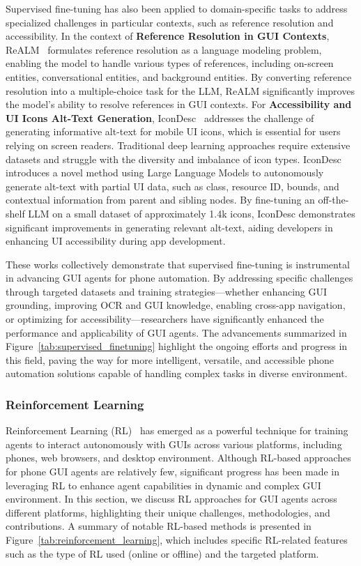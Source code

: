 Supervised fine-tuning has also been applied to domain-specific tasks to address specialized challenges in particular contexts, such as reference resolution and accessibility.
In the context of \textbf{Reference Resolution in GUI Contexts}, ReALM~\cite{moniz2024realm} formulates reference resolution as a language modeling problem, enabling the model to handle various types of references, including on-screen entities, conversational entities, and background entities. By converting reference resolution into a multiple-choice task for the LLM, ReALM significantly improves the model's ability to resolve references in GUI contexts.
For \textbf{Accessibility and UI Icons Alt-Text Generation}, IconDesc~\cite{haque2024infering} addresses the challenge of generating informative alt-text for mobile UI icons, which is essential for users relying on screen readers. Traditional deep learning approaches require extensive datasets and struggle with the diversity and imbalance of icon types. IconDesc introduces a novel method using Large Language Models to autonomously generate alt-text with partial UI data, such as class, resource ID, bounds, and contextual information from parent and sibling nodes. By fine-tuning an off-the-shelf LLM on a small dataset of approximately 1.4k icons, IconDesc demonstrates significant improvements in generating relevant alt-text, aiding developers in enhancing UI accessibility during app development.


These works collectively demonstrate that supervised fine-tuning is instrumental in advancing GUI agents for phone automation. By addressing specific challenges through targeted datasets and training strategies—whether enhancing GUI grounding, improving OCR and GUI knowledge, enabling cross-app navigation, or optimizing for accessibility—researchers have significantly enhanced the performance and applicability of GUI agents. The advancements summarized in Figure~\ref{tab:supervised_finetuning} highlight the ongoing efforts and progress in this field, paving the way for more intelligent, versatile, and accessible phone automation solutions capable of handling complex tasks in diverse environment.

\subsubsection{Reinforcement Learning}
\label{subsubsec:rl}


Reinforcement Learning (RL)~\cite{kaelbling1996reinforcement} has emerged as a powerful technique for training agents to interact autonomously with GUIs across various platforms, including phones, web browsers, and desktop environment. Although RL-based approaches for phone GUI agents are relatively few, significant progress has been made in leveraging RL to enhance agent capabilities in dynamic and complex GUI environment. In this section, we discuss RL approaches for GUI agents across different platforms, highlighting their unique challenges, methodologies, and contributions. A summary of notable RL-based methods is presented in Figure~\ref{tab:reinforcement_learning}, which includes specific RL-related features such as the type of RL used (online or offline) and the targeted platform.

